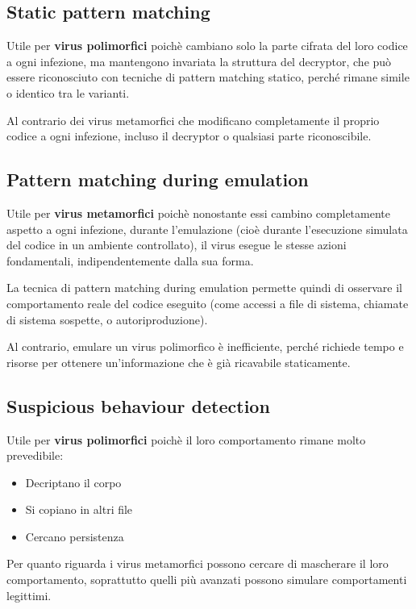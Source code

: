 \documentclass{report}
\begin{document}
\subsection{Static pattern matching}
\noindent Utile per \textbf{virus polimorfici} poichè cambiano solo la parte cifrata del loro codice a ogni infezione, ma mantengono invariata la struttura del decryptor,
che può essere riconosciuto con tecniche di pattern matching statico, perché rimane simile o identico tra le varianti.

\noindent Al contrario dei virus metamorfici che modificano completamente il proprio codice a ogni infezione, incluso il decryptor o qualsiasi parte riconoscibile.

\subsection{Pattern matching during emulation}
\noindent Utile per \textbf{virus metamorfici} poichè nonostante essi cambino completamente aspetto a ogni infezione, 
durante l'emulazione (cioè durante l'esecuzione simulata del codice in un ambiente controllato), il virus esegue le stesse azioni fondamentali, indipendentemente dalla sua forma.

\noindent La tecnica di pattern matching during emulation permette quindi di osservare il comportamento reale del codice eseguito (come accessi a file di sistema, chiamate di sistema sospette, o autoriproduzione).

\noindent Al contrario, emulare un virus polimorfico è inefficiente, perché richiede tempo e risorse per ottenere un'informazione che è già ricavabile staticamente.

\subsection{Suspicious behaviour detection}
\noindent Utile per \textbf{virus polimorfici} poichè il loro comportamento rimane molto prevedibile:
\begin{itemize}
    \item Decriptano il corpo
    \item Si copiano in altri file
    \item Cercano persistenza
\end{itemize}

\noindent Per quanto riguarda i virus metamorfici possono cercare di mascherare il loro comportamento,
soprattutto quelli più avanzati possono simulare comportamenti legittimi.
\end{document}
